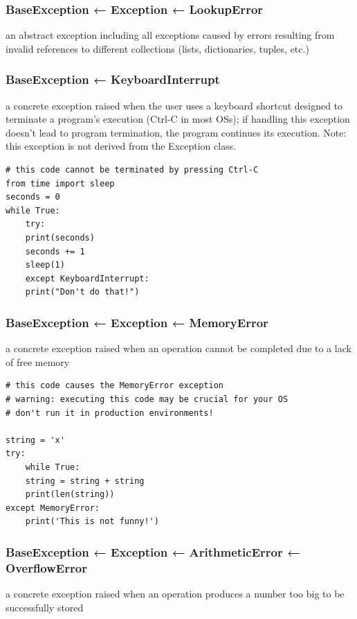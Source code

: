 \documentclass[11pt]{article}
\begin{document}
\subsubsection{BaseException ← Exception ← LookupError}
\label{sec:orgd30d82f}
an abstract exception including all exceptions caused by errors
resulting from invalid references to different collections (lists,
dictionaries, tuples, etc.)

\subsubsection{BaseException ← KeyboardInterrupt}
\label{sec:org8cac52a}
a concrete exception raised when the user uses a keyboard shortcut
designed to terminate a program’s execution (Ctrl-C in most OSs); if
handling this exception doesn’t lead to program termination, the
program continues its execution. Note: this exception is not derived
from the Exception class.

\begin{verbatim}
# this code cannot be terminated by pressing Ctrl-C
from time import sleep
seconds = 0
while True:
    try:
	print(seconds)
	seconds += 1
	sleep(1)
    except KeyboardInterrupt:
	print("Don't do that!")
\end{verbatim}

\subsubsection{BaseException ← Exception ← MemoryError}
\label{sec:orgcb9858f}
a concrete exception raised when an operation cannot be completed due
to a lack of free memory

\begin{verbatim}
# this code causes the MemoryError exception
# warning: executing this code may be crucial for your OS
# don't run it in production environments!

string = 'x'
try:
    while True:
	string = string + string
	print(len(string))
except MemoryError:
    print('This is not funny!')
\end{verbatim}

\subsubsection{BaseException ← Exception ← ArithmeticError ← OverflowError}
\label{sec:org9509299}
a concrete exception raised when an operation produces a number too
big to be successfully stored
\end{document}
